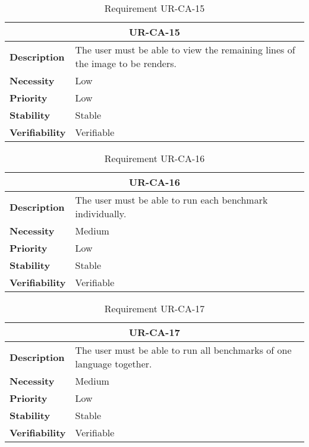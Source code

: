\begin{table}[H]
    \centering
    \begin{tabular}{l p{10cm}}
        \toprule
        \multicolumn{2}{c}{UR-CA-15} \\
        \toprule
        \textbf{Description}        & The user must be able to view the remaining lines of the image to be renders. \\
        \textbf{Necessity}          & Low   \\
        \textbf{Priority}           & Low   \\
        \textbf{Stability}          & Stable \\
        \textbf{Verifiability}      & Verifiable \\
    \end{tabular}
    \caption{Requirement UR-CA-15}
    \label{tab:ur-ca-15}
\end{table}

\begin{table}[H]
    \centering
    \begin{tabular}{l p{10cm}}
        \toprule
        \multicolumn{2}{c}{UR-CA-16} \\
        \toprule
        \textbf{Description}        & The user must be able to run each benchmark individually. \\
        \textbf{Necessity}          & Medium   \\
        \textbf{Priority}           & Low   \\
        \textbf{Stability}          & Stable \\
        \textbf{Verifiability}      & Verifiable \\
    \end{tabular}
    \caption{Requirement UR-CA-16}
    \label{tab:ur-ca-16}
\end{table}

\begin{table}[H]
    \centering
    \begin{tabular}{l p{10cm}}
        \toprule
        \multicolumn{2}{c}{UR-CA-17} \\
        \toprule
        \textbf{Description}        & The user must be able to run all benchmarks of one language together. \\
        \textbf{Necessity}          & Medium   \\
        \textbf{Priority}           & Low   \\
        \textbf{Stability}          & Stable \\
        \textbf{Verifiability}      & Verifiable \\
    \end{tabular}
    \caption{Requirement UR-CA-17}
    \label{tab:ur-ca-17}
\end{table}

